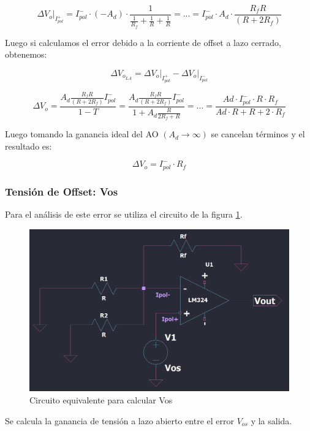 \[\left.\Delta V_{o} \right|_{I_{pol}^{+}} 
= I_{pol}^{-} \cdot (-A_d) \cdot \frac{1}{\frac{1}{R_f}+\frac{1}{R}+\frac{1}{R}} 
= ... = I_{pol}^{-} \cdot A_d \cdot \frac{R_f R}{(R+2 R_f)} \] 
 
Luego si calculamos el error debido a la corriente de offset a lazo cerrado, obtenemos:

 \[ \Delta V_{o_{LA}} = \left.\Delta V_{o} \right|_{I_{pol}^{+}} - \left.\Delta V_{o} \right|_{I_{pol}^{-}}  \] 



\[
\Delta V_{o}= \frac{A_d \frac{R_f R}{(R+2 R_f)} I_{pol}^{-}}{1 - T} 
= \frac{A_d \frac{R_f R}{(R+2 R_f)} I_{pol}^{-}}{1 + A_d \frac{R}{2 R_f+R}} 
= ... =  \frac{Ad \cdot  I_{pol}^{-} \cdot R \cdot R_f}{Ad \cdot R + R + 2 \cdot R_f} 
\] 

Luego  tomando la ganancia ideal del AO $\left(A_{d} \rightarrow \infty\right)$ se cancelan términos y el resultado es:

\[
\Delta V_{o} 
= I_{pol}^{-} \cdot R_f
\]


\subsubsection{Tensión de Offset: Vos}
 
Para el análisis de este error se utiliza el circuito de la figura \ref{fig:equivalente_vos}. 


\begin{figure}[h!]
    \centering
    \includegraphics[width=0.90\linewidth]{img/equivalente_vos.png}
    \caption{Circuito equivalente para calcular Vos}
    \label{fig:equivalente_vos}
\end{figure}

Se calcula la ganancia de tensión a lazo abierto entre el error $V_{os}$ y la salida.


